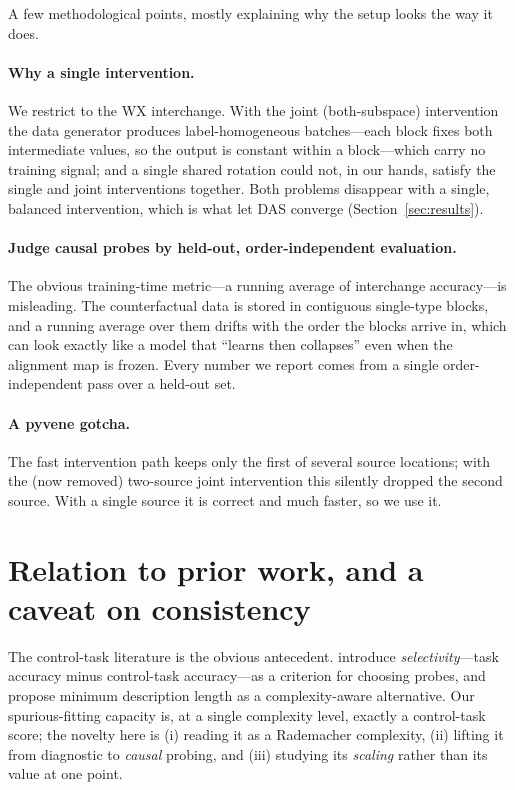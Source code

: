 \documentclass[11pt]{article}
\begin{document}
A few methodological points, mostly explaining why the setup looks the way it does.

\paragraph{Why a single intervention.} We restrict to the WX interchange.
With the joint (both-subspace) intervention the data generator produces
label-homogeneous batches---each block fixes both intermediate values, so the output
is constant within a block---which carry no training signal; and a single shared
rotation could not, in our hands, satisfy the single and joint interventions together.
Both problems disappear with a single, balanced intervention, which is what let DAS
converge (Section~\ref{sec:results}).

\paragraph{Judge causal probes by held-out, order-independent evaluation.} The obvious
training-time metric---a running average of interchange accuracy---is misleading. The
counterfactual data is stored in contiguous single-type blocks, and a running average
over them drifts with the order the blocks arrive in, which can look exactly like a
model that ``learns then collapses'' even when the alignment map is frozen. Every
number we report comes from a single order-independent pass over a held-out set.

\paragraph{A pyvene gotcha.} The fast intervention path keeps only the first of
several source locations; with the (now removed) two-source joint intervention this
silently dropped the second source. With a single source it is correct and much
faster, so we use it.

\section{Relation to prior work, and a caveat on consistency}\label{sec:related}

The control-task literature is the obvious antecedent. \citet{hewitt2019control}
introduce \emph{selectivity}---task accuracy minus control-task accuracy---as a
criterion for choosing probes, and \citet{voita2020information} propose minimum
description length as a complexity-aware alternative. Our spurious-fitting capacity
is, at a single complexity level, exactly a control-task score; the novelty here is
(i) reading it as a Rademacher complexity, (ii) lifting it from diagnostic to
\emph{causal} probing, and (iii) studying its \emph{scaling} rather than its value
at one point.
\end{document}
